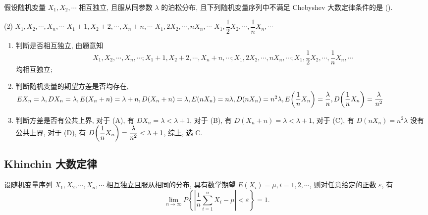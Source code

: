 \begin{example}
    假设随机变量 $X_1, X_2, \cdots $ 相互独立, 且服从同参数 $\lambda$ 的泊松分布, 且下列随机变量序列中不满足 Chebyshev 大数定律条件的是 (\quad).
    \begin{tasks}(2)
        \task $X_1, X_2, \cdots ,X_n, \cdots $
        \task $X_1+1, X_2+2, \cdots ,X_n+n, \cdots $
        \task $X_1, 2X_2, \cdots ,nX_n, \cdots $
        \task $X_1, \dfrac{1}{2}X_2, \cdots ,\dfrac{1}{n}X_n, \cdots $
    \end{tasks}
\end{example}
\begin{solution}
    \begin{enumerate}[label=(\arabic{*})]
        \item 判断是否相互独立,
              由题意知 $$X_1, X_2, \cdots ,X_n, \cdots ; X_1+1, X_2+2, \cdots ,X_n+n, \cdots ; X_1, 2X_2, \cdots ,nX_n, \cdots ; X_1, \dfrac{1}{2}X_2, \cdots ,\dfrac{1}{n}X_n, \cdots $$
              均相互独立;
        \item 判断随机变量的期望方差是否均存在,
        \begin{math}
            EX_n=\lambda, DX_n=\lambda, E(X_n+n)=\lambda+n, D(X_n+n)=\lambda,\\ 
            E(nX_n)=n\lambda, D(nX_n)=n^2\lambda, E\qty(\dfrac{1}{n}X_n)=\dfrac{\lambda}{n},D\qty(\dfrac{1}{n}X_n)=\dfrac{\lambda}{n^2}
        \end{math}
        \item 判断方差是否有公共上界, 
        对于 (A), 有 $DX_n=\lambda<\lambda+1$, 对于 (B), 有 $D(X_n+n)=\lambda<\lambda+1$, 对于 (C), 有 $D(nX_n)=n^2\lambda$ 没有公共上界, 对于 (D), 有 $D\qty(\dfrac{1}{n}X_n)=\dfrac{\lambda}{n^2}<\lambda+1$, 综上, 选 C.
    \end{enumerate}
\end{solution}

\subsection{Khinchin 大数定律}

\begin{theorem}
    \label{Khinchinslawoflargenumbers}
    设随机变量序列 $ X_{1}, X_{2}, \cdots, X_{n}, \cdots $ 相互独立且服从相同的分布, 具有数学期望 $ E\left(X_{i}\right)=\mu, i=1,2, \cdots $, 则对任意给定的正数 $ \varepsilon $, 有
    $$\lim _{n \rightarrow \infty} P\left\{\left|\frac{1}{n} \sum_{i=1}^{n} X_{i}-\mu\right|<\varepsilon\right\}=1 .$$
\end{theorem}

